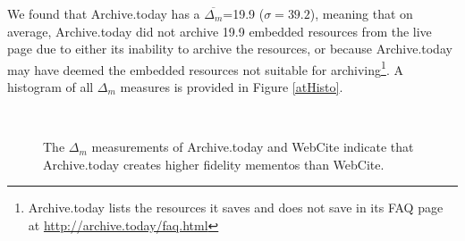 We found that Archive.today has a $\overline{\Delta_m}$=19.9 ($\sigma=39.2$), meaning that on average, Archive.today did not archive 19.9 embedded resources from the live page due to either its inability to archive the resources, or because Archive.today may have deemed the embedded resources not suitable for archiving\footnote{Archive.today lists the resources it saves and does not save in its FAQ page at \url{http://archive.today/faq.html}}. A histogram of all $\Delta_m$ measures is provided in Figure \ref{atHisto}.



\begin{figure}[h!]
  \begin{center}
    \\
  \end{center}
  \label{deltaHisto}
  \caption{The $\Delta_m$ measurements of Archive.today and WebCite indicate that Archive.today creates higher fidelity mementos than WebCite.}
\end{figure}


